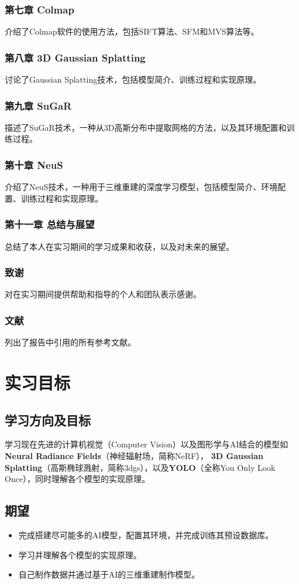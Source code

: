 \documentclass{nwputhesis}
\begin{document}
\subsubsection{第七章 Colmap}
介绍了Colmap软件的使用方法，包括SIFT算法、SFM和MVS算法等。
\subsubsection{第八章 3D Gaussian Splatting}
讨论了Gaussian Splatting技术，包括模型简介、训练过程和实现原理。
\subsubsection{第九章 SuGaR}
描述了SuGaR技术，一种从3D高斯分布中提取网格的方法，以及其环境配置和训练过程。
\subsubsection{第十章 NeuS}
介绍了NeuS技术，一种用于三维重建的深度学习模型，包括模型简介、环境配置、训练过程和实现原理。
\subsubsection{第十一章 总结与展望}
总结了本人在实习期间的学习成果和收获，以及对未来的展望。
\subsubsection{致谢} 
对在实习期间提供帮助和指导的个人和团队表示感谢。
\subsubsection{文献}
列出了报告中引用的所有参考文献。

\makespace
\section{实习目标}
\subsection{学习方向及目标}
学习现在先进的计算机视觉（Computer Vision）以及图形学与AI结合的模型如\textbf{Neural Radiance Fields}（神经辐射场，简称NeRF），
\textbf{3D Gaussian Splatting}（高斯椭球溅射，简称3dgs），以及\textbf{YOLO}（全称You Only Look Once），同时理解各个模型的实现原理。
\subsection{期望}
\begin{itemize}
    \item 完成搭建尽可能多的AI模型，配置其环境，并完成训练其预设数据库。
    \item 学习并理解各个模型的实现原理。
    \item 自己制作数据并通过基于AI的三维重建制作模型。
\end{itemize}
\makespace
\end{document}
